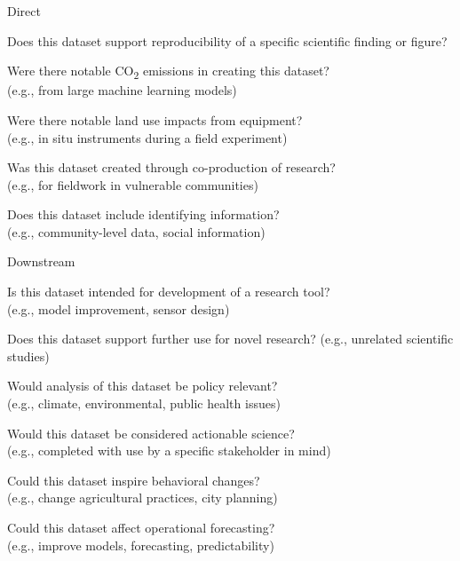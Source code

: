 \documentclass[letterpaper, 10 pt, transmag]{IEEEtran}
\newcommand{\checked}{✓}
\begin{document}

Direct
\begin{todolist}
  \item Does this dataset support reproducibility of a specific scientific finding or figure?
  \item Were there notable CO\textsubscript{2} emissions in creating this dataset? \\ 
  (e.g., from large machine learning models)
  \item Were there notable land use impacts from equipment? \\
  (e.g., in situ instruments during a field experiment)
  \item Was this dataset created through co-production of research? \\
  (e.g., for fieldwork in vulnerable communities)
  \item Does this dataset include identifying information? \\
  (e.g., community-level data, social information) 
\end{todolist}

Downstream
\begin{todolist}
  \item Is this dataset intended for development of a research tool? \\
  (e.g., model improvement, sensor design)
  \item Does this dataset support further use for novel research? (e.g., unrelated scientific studies)
  \item Would analysis of this dataset be policy relevant? \\
  (e.g., climate, environmental, public health issues)
  \item Would this dataset be considered actionable science? \\ 
  (e.g., completed with use by a specific stakeholder in mind)
  \item Could this dataset inspire behavioral changes? \\
  (e.g., change agricultural practices, city planning)
  \item Could this dataset affect operational forecasting? \\
  (e.g., improve models, forecasting, predictability)
\end{todolist}
\end{document}
